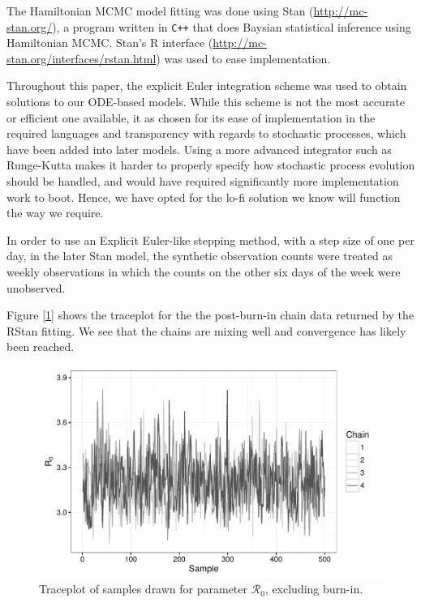    The Hamiltonian MCMC model fitting was done using Stan (\url{http://mc-stan.org/}), a program written in \verb|C++| that does Baysian statistical inference using Hamiltonian MCMC. Stan's R interface (\url{http://mc-stan.org/interfaces/rstan.html}) was used to ease implementation.

    Throughout this paper, the explicit Euler integration scheme was used to obtain solutions to our ODE-based models. While this scheme is not the most accurate or efficient one available, it as chosen for its ease of implementation in the required languages and transparency with regards to stochastic processes, which have been added into later models. Using a more advanced integrator such as Runge-Kutta makes it harder to properly specify how stochastic process evolution should be handled, and would have required significantly more implementation work to boot. Hence, we have opted for the lo-fi solution we know will function the way we require.

    In order to use an Explicit Euler-like stepping method, with a step size of one per day, in the later Stan model, the synthetic observation counts were treated as weekly observations in which the counts on the other six days of the week were unobserved.

    Figure [\ref{traceplot}] shows the traceplot for the the post-burn-in chain data returned by the RStan fitting. We see that the chains are mixing well and convergence has likely been reached.

    \begin{figure}
        \centering
        \captionsetup{width=0.8\linewidth}
        \includegraphics[width=\textwidth]{./images/traceplotR0.pdf}
        \caption{Traceplot of samples drawn for parameter $\mathcal{R}_0$, excluding burn-in. \label{traceplot}}
    \end{figure}

